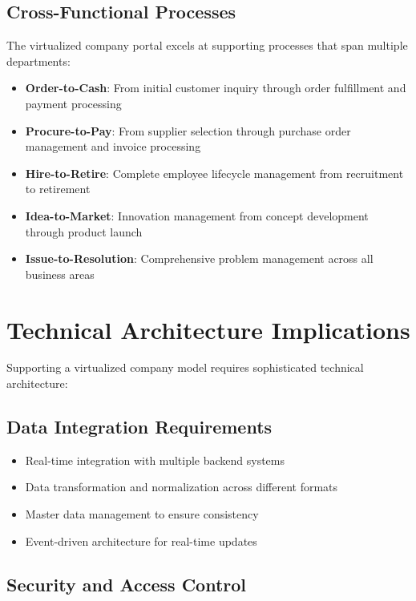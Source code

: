 \subsection{Cross-Functional Processes}

The virtualized company portal excels at supporting processes that span multiple departments:

\begin{itemize}
	\item \textbf{Order-to-Cash}: From initial customer inquiry through order fulfillment and payment processing
	\item \textbf{Procure-to-Pay}: From supplier selection through purchase order management and invoice processing
	\item \textbf{Hire-to-Retire}: Complete employee lifecycle management from recruitment to retirement
	\item \textbf{Idea-to-Market}: Innovation management from concept development through product launch
	\item \textbf{Issue-to-Resolution}: Comprehensive problem management across all business areas
\end{itemize}

\section{Technical Architecture Implications}
\label{sec:technical-implications}

Supporting a virtualized company model requires sophisticated technical architecture:

\subsection{Data Integration Requirements}

\begin{itemize}
	\item Real-time integration with multiple backend systems
	\item Data transformation and normalization across different formats
	\item Master data management to ensure consistency
	\item Event-driven architecture for real-time updates
\end{itemize}

\subsection{Security and Access Control}

